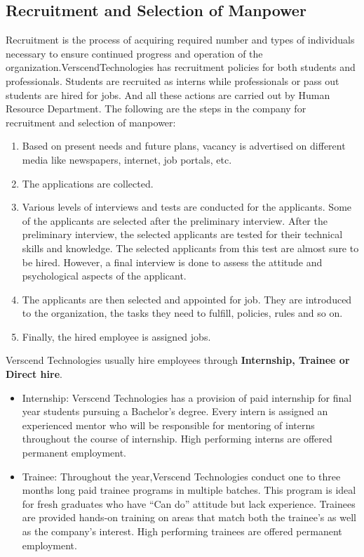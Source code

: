 \begin{itemize}
\subsection{Recruitment and Selection of Manpower}
Recruitment is the process of acquiring required number and types of individuals necessary to ensure
continued progress and operation of the organization.VerscendTechnologies has recruitment
policies for both students and professionals. Students are recruited as interns while professionals or pass out
students are hired for jobs. And all these actions are carried out by Human Resource Department. The
following are the steps in the company for recruitment and selection of manpower:
\begin{enumerate}
\item  Based on present needs and future plans, vacancy is advertised on different media like newspapers,
internet, job portals, etc.
\item  The applications are collected.
\item  Various levels of interviews and tests are conducted for the applicants. Some of the applicants are
selected after the preliminary interview. After the preliminary interview, the selected applicants are
tested for their technical skills and knowledge. The selected applicants from this test are almost sure
to be hired. However, a final interview is done to assess the attitude and psychological aspects of
the applicant.
\item  The applicants are then selected and appointed for job. They are introduced to the organization, the
tasks they need to fulfill, policies, rules and so on.
\item  Finally, the hired employee is assigned jobs.
\end{enumerate}
Verscend Technologies usually hire employees through \textbf{Internship, Trainee or Direct hire}.
\begin{itemize}
\item Internship: Verscend Technologies has a provision of paid internship for final year students
pursuing a Bachelor's degree. Every intern is assigned an experienced mentor who will be responsible
for mentoring of interns throughout the course of internship. High performing interns are offered
permanent employment.

\item Trainee: Throughout the year,Verscend Technologies conduct one to three months long
paid trainee programs in multiple batches. This program is ideal for fresh graduates who have “Can
do” attitude but lack experience. Trainees are provided hands-on training on areas that match both the
trainee’s as well as the company’s interest. High performing trainees are offered permanent
employment.


\end{itemize}
\end{itemize}
